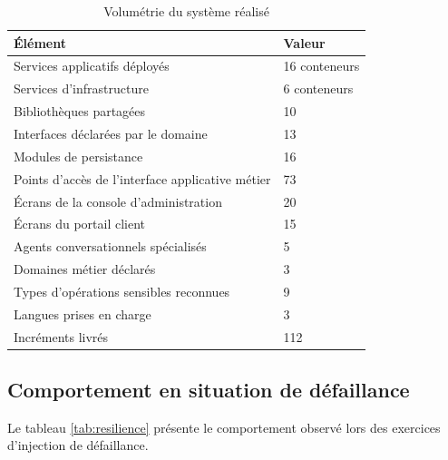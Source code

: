 \begin{table}[H]
\centering
\renewcommand{\arraystretch}{1.2}
\begin{tabular}{|p{8.0cm}|p{6.5cm}|}
\hline
\textbf{Élément} & \textbf{Valeur} \\
\hline
Services applicatifs déployés & 16 conteneurs \\
\hline
Services d'infrastructure & 6 conteneurs \\
\hline
Bibliothèques partagées & 10 \\
\hline
Interfaces déclarées par le domaine & 13 \\
\hline
Modules de persistance & 16 \\
\hline
Points d'accès de l'interface applicative métier & 73 \\
\hline
Écrans de la console d'administration & 20 \\
\hline
Écrans du portail client & 15 \\
\hline
Agents conversationnels spécialisés & 5 \\
\hline
Domaines métier déclarés & 3 \\
\hline
Types d'opérations sensibles reconnues & 9 \\
\hline
Langues prises en charge & 3 \\
\hline
Incréments livrés & 112 \\
\hline
\end{tabular}
\caption{Volumétrie du système réalisé}
\label{tab:volumetrie}
\end{table}

\subsection{Comportement en situation de défaillance}

Le tableau \ref{tab:resilience} présente le comportement observé lors des exercices d'injection de défaillance.

